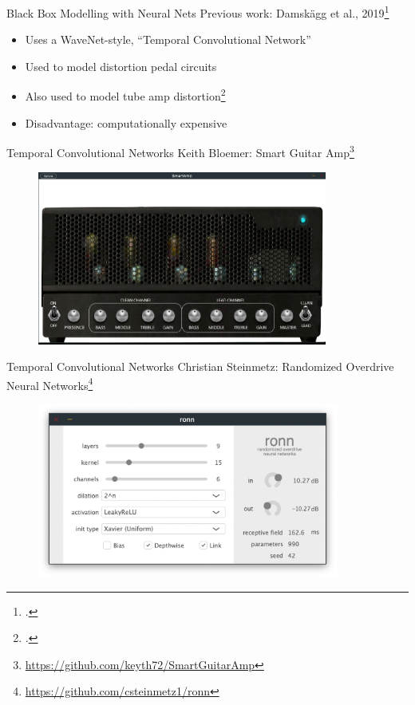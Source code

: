 \begin{frame}{Black Box Modelling with Neural Nets}
    Previous work: Damsk{\"a}gg et al., 2019\footcite[]{WaveNetVA}
    \vspace{1ex}
    \begin{itemize}
        \itemsep0.5em
        \item Uses a WaveNet-style, ``Temporal Convolutional Network''
        \item Used to model distortion pedal circuits
        \item Also used to model tube amp distortion\footcite[]{damskgg2018deep}
        \item Disadvantage: computationally expensive
    \end{itemize}
\end{frame}

\begin{frame}{Temporal Convolutional Networks}
    Keith Bloemer: Smart Guitar Amp\footnote{\url{https://github.com/keyth72/SmartGuitarAmp}}
    \begin{figure}
        \centering
        \includegraphics[height=2.25in]{Figures/SmartAmp.png}
    \end{figure}
\end{frame}

\begin{frame}{Temporal Convolutional Networks}
    Christian Steinmetz: Randomized Overdrive Neural Networks\footnote{\url{https://github.com/csteinmetz1/ronn}}
    \begin{figure}
        \centering
        \includegraphics[height=2.25in]{Figures/ronn-vst-ui.png}
    \end{figure}
\end{frame}

